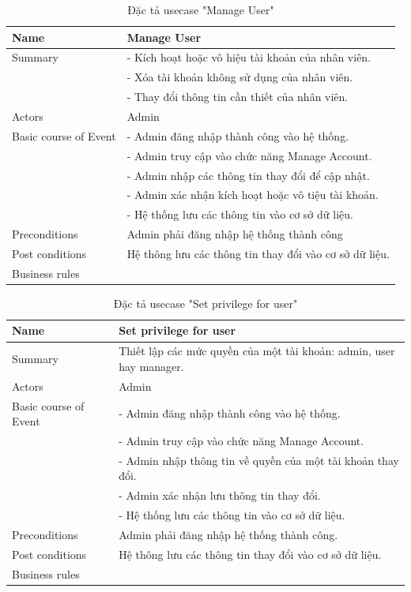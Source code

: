 \documentclass[a4paper]{article}
\begin{document}
\begin{table}[!h]
    \centering
        \begin{tabular}{|m{3.2cm}|m{10.5cm}|}
        \hline
        Name & Manage User\\
        \hline
        Summary & -	Kích hoạt hoặc vô hiệu tài khoản của nhân viên.\\
&-	Xóa tài khoản không sử dụng của nhân viên.\\
&-	Thay đổi thông tin cần thiết của nhân viên.\\
        \hline
        Actors & Admin\\
        \hline
        Basic course of Event & -	Admin đăng nhập thành công vào hệ thống.\\
&-	Admin truy cập vào chức năng Manage  Account.\\
&-	Admin nhập các thông tin thay đổi để cập nhật.\\
&-	Admin xác nhận kích hoạt hoặc vô tiệu tài khoản.\\
&-	Hệ thống lưu các thông tin vào cơ sở dữ liệu.\\
        \hline
        Preconditions & Admin phải đăng nhập hệ thống thành công \\
        \hline
        Post conditions & Hệ thông lưu các thông tin thay đổi vào cơ sở dữ liệu.\\
        \hline
        Business rules & \\
        \hline
        \end{tabular}
        \caption{Đặc tả usecase "Manage User"}
\end{table}  
\begin{table}[!h]
    \centering
        \begin{tabular}{|m{3.2cm}|m{10.5cm}|}
        \hline
        Name & Set privilege for user\\
        \hline
        Summary & Thiết lập các mức quyền của một tài khoản: admin, user hay manager.\\
        \hline
        Actors & Admin\\
        \hline
        Basic course of Event & -	Admin đăng nhập thành công vào hệ thống.\\
&-	Admin truy cập vào chức năng Manage  Account.\\
&-	Admin nhập  thông tin về quyền của một tài khoản thay đổi.\\
&-	Admin xác nhận lưu thông tin thay đổi.\\
&-	Hệ thống lưu các thông tin vào cơ sở dữ liệu.\\
        \hline
        Preconditions & Admin phải đăng nhập hệ thống thành công. \\
        \hline
        Post conditions & Hệ thông lưu các thông tin thay đổi vào cơ sở dữ liệu.\\
        \hline
        Business rules & \\
        \hline
        \end{tabular}
        \caption{Đặc tả usecase "Set privilege for user"}
\end{table}  
\end{document}
